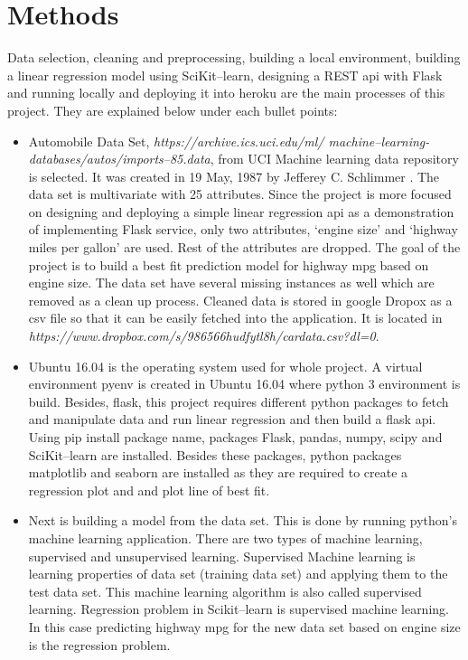 \section{Methods}
  Data selection, cleaning and preprocessing, building a local
  environment, building a linear regression model using SciKit--learn,
  designing a REST api with Flask and running locally and deploying
  it into heroku are the main
  processes of this project. They are explained below under each bullet
  points:
\begin{itemize}
    \item Automobile Data Set, \textit{https://archive.ics.uci.edu/ml/
          machine--learning-databases/autos/imports--85.data}, from UCI
          Machine learning data repository is selected. It was created
          in 19 May, 1987 by Jefferey C. Schlimmer \cite{uci-com}. The
          data set is multivariate with 25 attributes. Since the project
          is more focused on designing and deploying a simple linear
          regression api as a demonstration of implementing Flask service,
          only two attributes, `engine size' and `highway miles per gallon'
          are used. Rest of the attributes are dropped. The goal of the
          project is to build a best fit prediction model for highway mpg
          based on engine size. The data set have several missing instances
 as well which are removed as a clean up process. Cleaned data is stored in
 google Dropox as a csv   file so that it can be easily fetched into the
 application. It is located in \textit{https://www.dropbox.com/s/986566hudfytl8h/cardata.csv?dl=0}.
    \item Ubuntu 16.04 is the operating system used for whole project.
  A virtual environment pyenv is created in Ubuntu 16.04 where python 3
 environment is build. Besides, flask, this project requires different python
 packages to fetch and manipulate data and run linear regression and
 then build a flask api. Using pip install package name, packages Flask,
 pandas, numpy, scipy and SciKit--learn are installed. Besides these
 packages, python packages matplotlib and seaborn are installed as they
 are required to create a regression plot and and plot line of best fit. 
    \item Next is building a model from the data set. This is done by
 running python's machine learning application. There are two types of
 machine learning, supervised and unsupervised learning. Supervised
 Machine learning is learning properties of data set (training data set)
 and applying them to the test data set. This machine learning algorithm
 is also called supervised learning. Regression problem in Scikit--learn
 is supervised machine learning. In this case predicting highway mpg for
 the new data set based on engine size is the regression problem.
    

\end{itemize}
